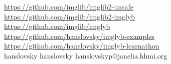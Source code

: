 \documentclass[%
]{beamer}
\newcommand{\urlScrSz}[1]{\scriptsize\url{#1}}
\begin{document}
\begin{frame}[fragile]
    {    
        \tiny
        \urlScrSz{https://github.com/imglib/imglib2-unsafe}\\
        \urlScrSz{https://github.com/imglib/imglib2-imglyb}\\
        \urlScrSz{https://github.com/imglib/imglyb}\\
        \urlScrSz{https://github.com/hanslovsky/imglyb-examples}\\
        \urlScrSz{https://github.com/hanslovsky/imglyb-learnathon}\\
    }
    \vspace{1em}
    {\color{gray}\faGithub} hanslovsky \hfill {\color{gray}\faTwitter} hanslovsky \hfill {\color{gray}\faEnvelope} hanslovskyp@janelia.hhmi.org
\end{frame}
\end{document}
